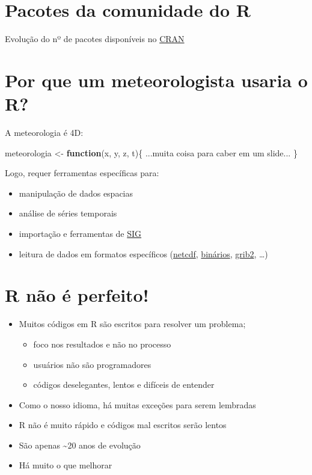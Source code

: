 \documentclass[]{book}
\newenvironment{Shaded}{\begin{snugshade}}{\end{snugshade}}
\newcommand{\StringTok}[1]{\textcolor[rgb]{0.31,0.60,0.02}{#1}}
\newcommand{\ControlFlowTok}[1]{\textcolor[rgb]{0.13,0.29,0.53}{\textbf{#1}}}
\newcommand{\NormalTok}[1]{#1}
\providecommand{\tightlist}{%
  \setlength{\itemsep}{0pt}\setlength{\parskip}{0pt}}
\begin{document}
\section{Pacotes da comunidade do R}\label{pacotes-da-comunidade-do-r}

Evolução do nº de pacotes disponíveis no
\href{http://cran.r-project.org/mirrors.html}{CRAN}

\section{Por que um meteorologista usaria o
R?}\label{por-que-um-meteorologista-usaria-o-r}

A meteorologia é 4D:

\begin{Shaded}
\begin{Highlighting}[]
\NormalTok{meteorologia <-}\StringTok{ }\ControlFlowTok{function}\NormalTok{(x, y, z, t)\{}
\NormalTok{  ...muita coisa para caber em um slide...}
\NormalTok{\}}
\end{Highlighting}
\end{Shaded}

Logo, requer ferramentas específicas para:

\begin{itemize}
\item
  manipulação de dados espacias
\item
  análise de séries temporais
\item
  importação e ferramentas de
  \href{https://pt.wikipedia.org/wiki/Sistema_de_informa\%C3\%A7\%C3\%A3o_geogr\%C3\%A1fica}{SIG}
\item
  leitura de dados em formatos específicos
  (\href{https://en.wikipedia.org/wiki/NetCDF}{netcdf},
  \href{https://en.wikipedia.org/wiki/Binary_file}{binários},
  \href{https://en.wikipedia.org/wiki/GRIB}{grib2}, \ldots{})
\end{itemize}

\section{R não é perfeito!}\label{r-nao-e-perfeito}

\begin{itemize}
\item
  Muitos códigos em R são escritos para resolver um problema;

  \begin{itemize}
  \tightlist
  \item
    foco nos resultados e não no processo
  \item
    usuários não são programadores
  \item
    códigos deselegantes, lentos e difíceis de entender
  \end{itemize}
\item
  Como o nosso idioma, há muitas exceções para serem lembradas
\item
  R não é muito rápido e códigos mal escritos serão lentos
\item
  São apenas \textasciitilde{}20 anos de evolução
\item
  Há muito o que melhorar
\end{itemize}
\end{document}
